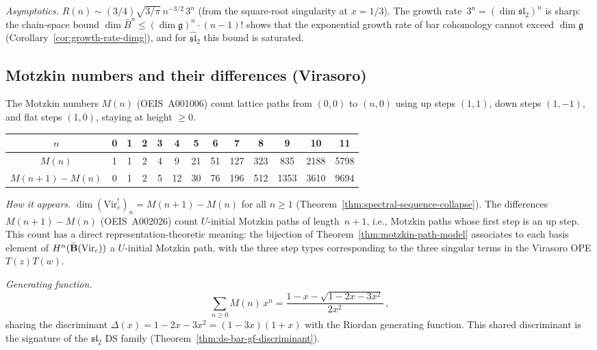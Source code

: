 \emph{Asymptotics.}
$R(n) \sim (3/4)\sqrt{3/\pi}\, n^{-3/2}\, 3^n$ (from the square-root singularity at $x = 1/3$).  The growth rate~$3^n = (\dim\mathfrak{sl}_2)^n$ is sharp: the chain-space bound $\dim\bar{B}^n \leq (\dim\mathfrak{g})^n \cdot (n-1)!$ shows that the exponential growth rate of bar cohomology cannot exceed $\dim\mathfrak{g}$ (Corollary~\ref{cor:growth-rate-dimg}), and for $\widehat{\mathfrak{sl}}_2$ this bound is saturated.

\subsection{Motzkin numbers and their differences (Virasoro)}
\label{subsec:motzkin}

The Motzkin numbers $M(n)$ (OEIS~A001006) count lattice paths from $(0,0)$ to $(n,0)$ using up steps $(1,1)$, down steps $(1,-1)$, and flat steps $(1,0)$, staying at height $\geq 0$.

\begin{center}
\renewcommand{\arraystretch}{1.2}
\begin{tabular}{c|cccccccccccc}
$n$ & 0 & 1 & 2 & 3 & 4 & 5 & 6 & 7 & 8 & 9 & 10 & 11 \\
\hline
$M(n)$ & 1 & 1 & 2 & 4 & 9 & 21 & 51 & 127 & 323 & 835 & 2188 & 5798 \\
$M(n{+}1) - M(n)$ & 0 & 1 & 2 & 5 & 12 & 30 & 76 & 196 & 512 & 1353 & 3610 & 9694
\end{tabular}
\end{center}

\emph{How it appears.}
$\dim(\mathrm{Vir}_c^!)_n = M(n+1) - M(n)$ for all $n \geq 1$ (Theorem~\ref{thm:spectral-sequence-collapse}).  The differences $M(n+1) - M(n)$ (OEIS~A002026) count $U$-initial Motzkin paths of length~$n+1$, i.e., Motzkin paths whose first step is an up step.  This count has a direct representation-theoretic meaning: the bijection of Theorem~\ref{thm:motzkin-path-model} associates to each basis element of $H^n(\bar{\mathbf{B}}(\mathrm{Vir}_c))$ a $U$-initial Motzkin path, with the three step types corresponding to the three singular terms in the Virasoro OPE $T(z)T(w)$.

\emph{Generating function.}
\[
\sum_{n \geq 0} M(n)\,x^n
= \frac{1 - x - \sqrt{1-2x-3x^2}}{2x^2}\,,
\]
sharing the discriminant $\Delta(x) = 1-2x-3x^2 = (1-3x)(1+x)$ with the Riordan generating function.  This shared discriminant is the signature of the $\mathfrak{sl}_2$ DS family (Theorem~\ref{thm:ds-bar-gf-discriminant}).

